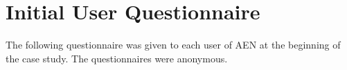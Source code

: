 

\appendix
\newpage
\chapter{Initial User Questionnaire}
\label{app:questionnaire1}
The following questionnaire was given to each user of AEN at
the beginning of the case study.  The questionnaires were anonymous. %

